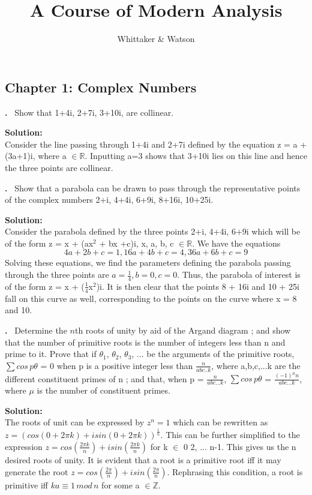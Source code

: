 \documentclass{article}
\date{}
\title{A Course of Modern Analysis}
\author{Whittaker \& Watson}
\newcommand{\R}{\mathbb{R}}
\newcounter{problem}
\newcounter{solution}
\newcommand\Problem{%
  \stepcounter{problem}%
  \textbf{\theproblem.}~%
  \setcounter{solution}{0}%
}
\newcommand\TheSolution{%
  \textbf{Solution:}\\%
}
\begin{document}
\maketitle
\subsection*{Chapter 1: Complex Numbers}
\Problem Show that 1+4i, 2+7i, 3+10i, are collinear.

\TheSolution Consider the line passing through 1+4i and 2+7i defined by the equation z = a + (3a+1)i, where a $\in\R$. Inputting a=3 shows that 3+10i lies on this line and hence the three points are collinear.

\Problem Show that a parabola can be drawn to pass through the representative points of the complex numbers 2+i, 4+4i, 6+9i, 8+16i, 10+25i.

\TheSolution Consider the parabola defined by the three points 2+i, 4+4i, 6+9i which will be of the form z = x + (ax$^2$ + bx +c)i, x, a, b, c $\in\R$. We have the equations
\[ 4a+2b+c = 1,  
16a + 4b +c = 4,  
36a + 6b + c = 9
\]
Solving these equations, we find the parameters defining the parabola passing through the three points are $a = \frac{1}{4}, b = 0, c= 0$. Thus, the parabola of interest is of the form z = x + ($\frac{1}{4}$x$^2$)i. It is then clear that the points 8 + 16i and 10 + 25i fall on this curve as well, corresponding to the points on the curve where x = 8 and 10.

\Problem Determine the $n$th roots of unity by aid of the Argand diagram ; and show that the number of primitive roots is the number of integers less than n and prime to it. Prove that if $\theta_1$, $\theta_2$, $\theta_3$, ... be the arguments of the primitive roots, $\sum cos\,p\theta$ = 0 when p is a positive integer less than $\frac{n}{abc..k}$, where a,b,c,...k are the different constituent primes of n ; and that, when p = $\frac{n}{abc...k}$, $\sum cos\,p\theta$ = $\frac{(-1)^\mu n}{abc...k}$, where $\mu$ is the number of constituent primes.

\TheSolution  The roots of unit can be expressed by $z^n = 1$ which can be rewritten as $z = (cos (0+2\pi k)+ i sin(0+2\pi k))^\frac{1}{n}$. This can be further simplified to the expression $z = cos(\frac{2\pi k}{n}) + i sin(\frac{2\pi k}{n})$ for k $\in$ 0 2, ... n-1. This gives us the n desired roots of unity. It is evident that a root is a primitive root iff it may generate the root $z = cos(\frac{2\pi }{n}) + i sin(\frac{2\pi }{n})$. Rephrasing this condition, a root is primitive iff $ka \equiv 1\,mod\,n$ for some a $\in \mathbb{Z}$. \par
\end{document}
